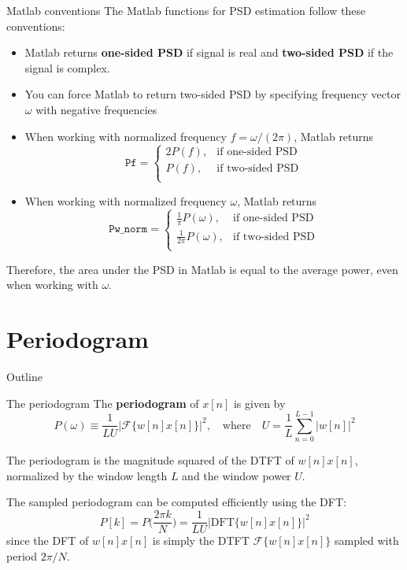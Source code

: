 \documentclass[10pt]{beamer}
\begin{document}
%
\begin{frame}{Matlab conventions}
The Matlab functions for PSD estimation follow these conventions:
\begin{itemize}
	\item Matlab returns \textbf{one-sided PSD} if signal is real and \textbf{two-sided PSD} if the signal is complex.
	\item You can force Matlab to return two-sided PSD by specifying frequency vector $\omega$ with negative frequencies
	\item When working with normalized frequency $f = \omega/(2\pi)$, Matlab returns 
	\begin{equation*}
		\texttt{Pf} = \begin{cases}
		2P(f), &\text{if one-sided PSD} \\
		P(f), &\text{if two-sided PSD} \\
		\end{cases}
	\end{equation*}
	\item When working with normalized frequency $\omega$, Matlab returns 	
	\begin{equation*}
	\texttt{Pw\_norm} = \displaystyle\begin{cases}
		\displaystyle\frac{1}{\pi}P(\omega), &\text{if one-sided PSD} \\
		\displaystyle\frac{1}{2\pi}P(\omega), &\text{if two-sided PSD} \\
	\end{cases}
	\end{equation*}
\end{itemize}
Therefore, the area under the PSD in Matlab is equal to the average power, even when working with $\omega$.
\end{frame}

%
\section{Periodogram}
\begin{frame}{Outline}
	\tableofcontents[currentsection]
\end{frame}
\begin{frame}{The periodogram}
	The \textbf{periodogram} of $x[n]$ is given by
	\begin{equation*}
		P(\omega) \equiv \frac{1}{LU}|\mathcal{F}\{w[n]x[n]\}|^2, \quad\text{where}\quad U = \frac{1}{L}\sum_{n = 0}^{L-1}|w[n]|^2
	\end{equation*}
	
	The periodogram is the magnitude squared of the DTFT of $w[n]x[n]$, normalized by the window length $L$ and the window power $U$.
	
	\vspace{0.25cm}
	The sampled periodogram can be computed efficiently using the DFT:
	\begin{equation*}
		P[k] = P\Big(\frac{2\pi k}{N}\Big) = \frac{1}{LU}|\mathrm{DFT}\{w[n]x[n]\}|^2
	\end{equation*}
	since the DFT of $w[n]x[n]$ is simply the DTFT $\mathcal{F}\{w[n]x[n]\}$ sampled with period $2\pi/N$.
\end{frame}
\end{document}

